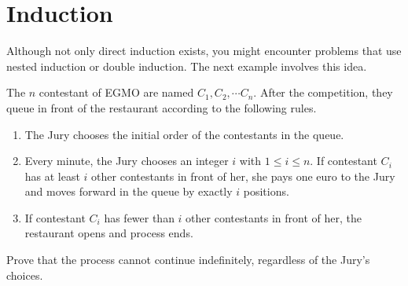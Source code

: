 \begin{example}

\end{example}

\section{Induction}

\begin{example}

\end{example}
Although not only direct induction exists, you might encounter problems that use nested induction or double induction. The next example involves this idea.
\begin{example} [EGMO 2018]
The $n$ contestant of EGMO are named $C_1, C_2, \cdots C_n$. After the competition, they queue in front of the restaurant according to the following rules.
\begin{enumerate}
    \item The Jury chooses the initial order of the contestants in the queue.
    \item Every minute, the Jury chooses an integer $i$ with $1 \leq i \leq n$.
    If contestant $C_i$ has at least $i$ other contestants in front of her, she pays one euro to the Jury and moves forward in the queue by exactly $i$ positions.
    \item If contestant $C_i$ has fewer than $i$ other contestants in front of her, the restaurant opens and process ends.
\end{enumerate}
Prove that the process cannot continue indefinitely, regardless of the Jury’s choices.
\end{example}

